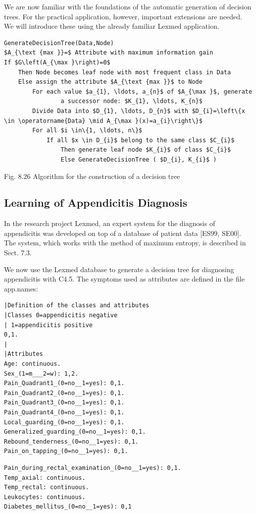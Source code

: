 \documentclass[10pt]{book}
\begin{document}
We are now familiar with the foundations of the automatic generation of decision trees. For the practical application, however, important extensions are needed. We will introduce these using the already familiar Lexmed application.

\begin{verbatim}
GenerateDecisionTree(Data,Node)
$A_{\text {max }}=$ Attribute with maximum information gain
If $G\left(A_{\max }\right)=0$
    Then Node becomes leaf node with most frequent class in Data
    Else assign the attribute $A_{\text {max }}$ to Node
        For each value $a_{1}, \ldots, a_{n}$ of $A_{\max }$, generate
                a successor node: $K_{1}, \ldots, K_{n}$
        Divide Data into $D_{1}, \ldots, D_{n}$ with $D_{i}=\left\{x \in \operatorname{Data} \mid A_{\max }(x)=a_{i}\right\}$
        For all $i \in\{1, \ldots, n\}$
            If all $x \in D_{i}$ belong to the same class $C_{i}$
                Then generate leaf node $K_{i}$ of class $C_{i}$
                Else GenerateDecisionTree ( $D_{i}, K_{i}$ )
\end{verbatim}

Fig. 8.26 Algorithm for the construction of a decision tree

\subsection{Learning of Appendicitis Diagnosis}
In the research project Lexmed, an expert system for the diagnosis of appendicitis was developed on top of a database of patient data [ES99, SE00]. The system, which works with the method of maximum entropy, is described in Sect. 7.3.

We now use the Lexmed database to generate a decision tree for diagnosing appendicitis with C4.5. The symptoms used as attributes are defined in the file app.names:

\begin{verbatim}
|Definition of the classes and attributes
|Classes 0=appendicitis negative
| 1=appendicitis positive
0,1.
|
|Attributes
Age: continuous.
Sex_(1=m___2=w): 1,2.
Pain_Quadrant1_(0=no__1=yes): 0,1.
Pain_Quadrant2_(0=no__1=yes): 0,1.
Pain_Quadrant3_(0=no__1=yes): 0,1.
Pain_Quadrant4_(0=no__1=yes): 0,1.
Local_guarding_(0=no__1=yes): 0,1.
Generalized_guarding_(0=no__1=yes): 0,1.
Rebound_tenderness_(0=no__1=yes): 0,1.
Pain_on_tapping_(0=no__1=yes): 0,1.
\end{verbatim}

\begin{verbatim}
Pain_during_rectal_examination_(0=no__1=yes): 0,1.
Temp_axial: continuous.
Temp_rectal: continuous.
Leukocytes: continuous.
Diabetes_mellitus_(0=no__1=yes): 0,1
\end{verbatim}
\end{document}
